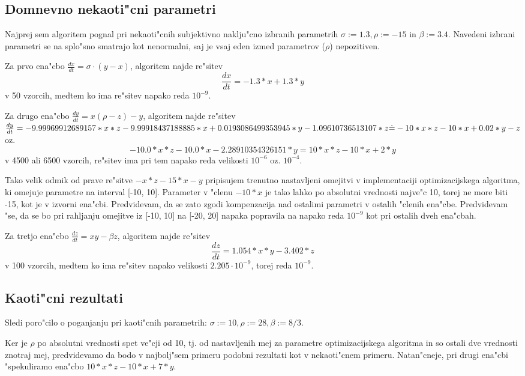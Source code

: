 \documentclass[10pt,a4paper]{article}
\begin{document}
\subsection{Domnevno nekaoti"cni parametri}
Najprej sem algoritem pognal pri nekaoti"cnih subjektivno naklju"cno izbranih parametrih
$\sigma:=1.3, \rho:=-15$ in $\beta:=3.4$.
Navedeni izbrani parametri se na splo"sno smatrajo kot nenormalni, saj je vsaj eden izmed parametrov
($\rho$) nepozitiven.

Za prvo ena"cbo $\frac{dx}{dt} = \sigma \cdot(y-x)$, algoritem najde re"sitev 
$$\frac{dx}{dt} =  -1.3*x + 1.3*y$$ 
v 50 vzorcih, medtem ko ima re"sitev napako reda $10^{-9}$.

Za drugo ena"cbo 
$\frac{dy}{dt} = x(\rho-z) - y$,
algoritem najde re"sitev  \\
$\frac{dy}{dt} = -9.99969912689157*x*z - 9.99918437188885*x 
+ 0.0193086499353945*y - 1.09610736513107*z \\ 
\dot{=} -10*x*z -10*x +0.02*y -z $
\enspace oz. $$-10.0*x*z - 10.0*x - 2.28910354326151*y = 10*x*z -10*x +2*y$$ v 
4500 ali 6500 vzorcih, re"sitev ima pri tem napako 
reda velikosti $10^{-6}$ oz. $10^{-4}$. 

Tako velik odmik od prave re"sitve  
$-x*z-15*x-y$ pripisujem trenutno nastavljeni omejitvi v implementaciji optimizacijskega
algoritma, ki omejuje parametre na interval [-10, 10]. Parameter v "clenu $-10*x$ je tako
lahko po absolutni vrednosti najve"c 10, torej ne more biti -15, kot je v izvorni ena"cbi.
Predvidevam, da se zato zgodi kompenzacija nad ostalimi parametri v ostalih "clenih ena"cbe.
Predvidevam "se, da se bo pri rahljanju omejitve iz [-10, 10] na [-20, 20] napaka popravila
na napako reda $10^{-9}$ kot pri ostalih dveh ena"cbah.

Za tretjo ena"cbo 
$\frac{dz}{dt} = xy - \beta z$,
 algoritem najde re"sitev 
 $$\frac{dz}{dt} = 1.054*x*y - 3.402*z$$
v 100 vzorcih, medtem ko ima re"sitev napako velikosti 
$2.205\cdot 10^{-9}$, torej reda $10^{-9}$.

\subsection{Kaoti"cni rezultati}

Sledi poro"cilo o poganjanju pri kaoti"cnih parametrih:
$\sigma:=10, \rho:=28, \beta:=8/3$.

Ker je $\rho$ po absolutni vrednosti spet ve"cji od 10, tj. od nastavljenih 
mej za parametre optimizacijskega algoritma in so ostali dve vrednosti 
znotraj mej, predvidevamo da bodo v najbolj"sem primeru podobni rezultati kot 
v nekaoti"cnem primeru. Natan"cneje, pri drugi ena"cbi "spekuliramo
ena"cbo $10*x*z -10*x +7*y$.
\end{document}
